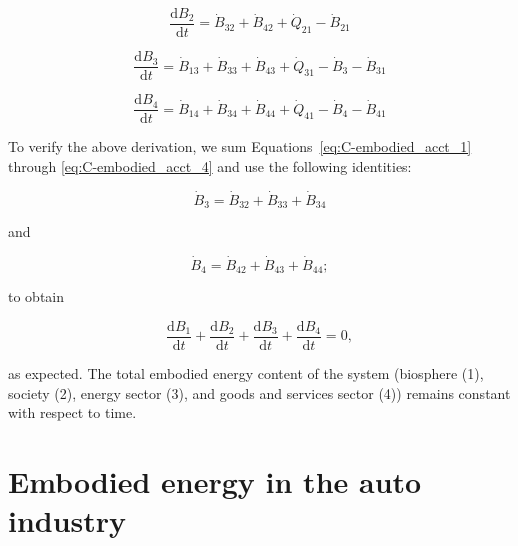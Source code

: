 \begin{equation} \label{eq:C-embodied_acct_2}
	\frac{\mathrm{d}B_{2}}{\mathrm{d}t} 	 
	= \dot{B}_{32} 
	+ \dot{B}_{42} 
	+ \dot{Q}_{21} 
	- \dot{B}_{21}
\end{equation}

\begin{equation} \label{eq:C-embodied_acct_3}
	\frac{\mathrm{d}B_{3}}{\mathrm{d}t} 	 
	= \dot{B}_{13} 
	+ \dot{B}_{33} 
	+ \dot{B}_{43} 
	+ \dot{Q}_{31} 
	- \dot{B}_{3} 
	- \dot{B}_{31}
\end{equation}

\begin{equation} \label{eq:C-embodied_acct_4}
	\frac{\mathrm{d}B_{4}}{\mathrm{d}t}	 
	= \dot{B}_{14} 
	+ \dot{B}_{34} 
	+ \dot{B}_{44} 
	+ \dot{Q}_{41} 
	- \dot{B}_{4} 
	- \dot{B}_{41}
\end{equation}

To verify the above derivation, 
we sum Equations~\ref{eq:C-embodied_acct_1} through 
\ref{eq:C-embodied_acct_4} 
and use the following identities:

\begin{equation} \label{eq:C-B_sum_3_output}
	\dot{B}_3 
	= \dot{B}_{32} 
	+ \dot{B}_{33} 
	+ \dot{B}_{34}
\end{equation}

\noindent and

\begin{equation} \label{eq:C-B_sum_4_output}
	\dot{B}_4 
	= \dot{B}_{42} 
	+ \dot{B}_{43} 
	+ \dot{B}_{44};
\end{equation}

\noindent to obtain

\begin{equation} \label{eq:C-B_sums_to_zero}
	\frac{\mathrm{d}B_{1}}{\mathrm{d}t} 
	+ \frac{\mathrm{d}B_{2}}{\mathrm{d}t} 
	+ \frac{\mathrm{d}B_{3}}{\mathrm{d}t} 
	+ \frac{\mathrm{d}B_{4}}{\mathrm{d}t} 
	= 0,
\end{equation}

\noindent as expected. The total embodied energy content of the system 
(biosphere (1), society (2), energy sector (3), and goods and services sector (4)) 
remains constant with respect to time.


\section{Embodied energy in the auto industry}
\label{sec:embodied_energy_auto}

